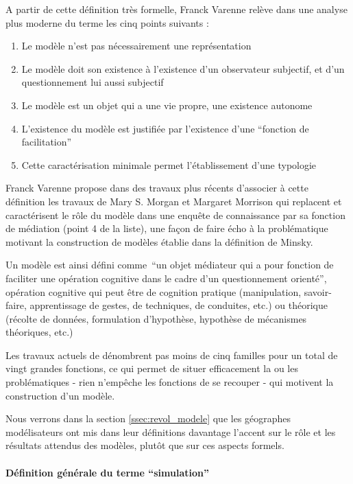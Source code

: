 A partir de cette définition très formelle, Franck Varenne \autocite{Varenne2008} relève dans une analyse plus moderne du terme les cinq points suivants : 
\begin{enumerate}
  \item Le modèle n'est pas nécessairement une représentation
  \item Le modèle doit son existence à l'existence d'un observateur subjectif, et d'un questionnement lui aussi subjectif
  \item Le modèle est un objet qui a une vie propre, une existence autonome
  \item L'existence du modèle est justifiée par l'existence d'une \enquote{fonction de facilitation}
  \item Cette caractérisation minimale permet l'établissement d'une typologie
\end{enumerate}

Franck Varenne propose dans des travaux plus récents \autocite{Varenne2013} d'associer à cette définition les travaux de Mary S. Morgan et Margaret Morrison qui replacent et caractérisent le rôle du modèle dans une enquête de connaissance par sa fonction de médiation (point 4 de la liste), une façon de faire écho à la problématique motivant la construction de modèles établie dans la définition de Minsky.

Un modèle est ainsi défini comme \enquote{un objet médiateur qui a pour fonction de faciliter une opération cognitive dans le cadre d'un questionnement orienté}, opération cognitive qui peut être de cognition pratique (manipulation,  savoir-faire, apprentissage de gestes, de techniques, de conduites, etc.) ou théorique (récolte de données, formulation d'hypothèse, hypothèse de mécanismes théoriques, etc.) \autocite{Varenne2013}

Les travaux actuels de \textcite{Varenne2008, Varenne2013} dénombrent pas moins de cinq familles pour un total de vingt grandes fonctions, ce qui permet de situer efficacement la ou les problématiques - rien n’empêche les fonctions de se recouper - qui motivent la construction d'un modèle. 

Nous verrons dans la section \ref{ssec:revol_modele} que les géographes modélisateurs ont mis dans leur définitions davantage l'accent sur le rôle et les résultats attendus des modèles, plutôt que sur ces aspects formels.

\paragraph{Définition générale du terme \enquote{simulation}}

